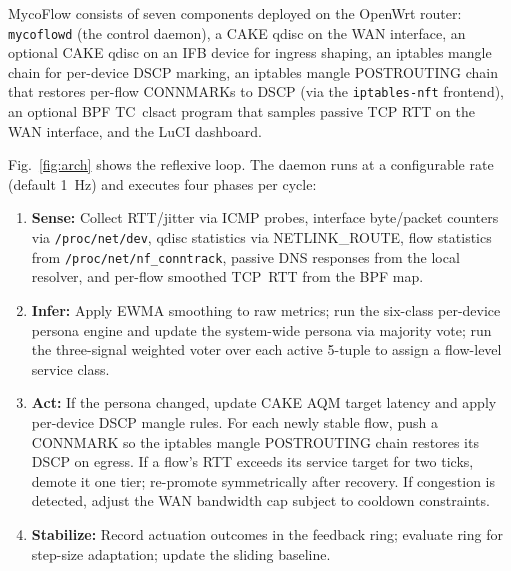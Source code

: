 \documentclass[conference]{IEEEtran}
\begin{document}
MycoFlow consists of seven components deployed on the OpenWrt router:
\texttt{mycoflowd} (the control daemon), a CAKE qdisc on the WAN interface,
an optional CAKE qdisc on an IFB device for ingress shaping, an iptables
mangle chain for per-device DSCP marking, an iptables mangle POSTROUTING
chain that restores per-flow CONNMARKs to DSCP (via the \texttt{iptables-nft}
frontend), an optional BPF TC~clsact
program that samples passive TCP RTT on the WAN interface, and the LuCI
dashboard.

Fig.~\ref{fig:arch} shows the reflexive loop.
The daemon runs at a configurable rate (default 1~Hz) and executes four
phases per cycle:

\begin{enumerate}
  \item \textbf{Sense:} Collect RTT/jitter via ICMP probes, interface
    byte/packet counters via \texttt{/proc/net/dev}, qdisc statistics
    via NETLINK\_ROUTE, flow statistics from
    \texttt{/proc/net/nf\_conntrack}, passive DNS responses from the
    local resolver, and per-flow smoothed TCP~RTT from the BPF map.
  \item \textbf{Infer:} Apply EWMA smoothing to raw metrics; run the
    six-class per-device persona engine and update the system-wide
    persona via majority vote; run the three-signal weighted voter
    over each active 5-tuple to assign a flow-level service class.
  \item \textbf{Act:} If the persona changed, update CAKE AQM target
    latency and apply per-device DSCP mangle rules. For each
    newly stable flow, push a CONNMARK so the iptables mangle
    POSTROUTING chain restores its DSCP on egress.
    If a flow's RTT exceeds its service target for two ticks,
    demote it one tier; re-promote symmetrically after recovery.
    If congestion is detected, adjust the WAN bandwidth cap
    subject to cooldown constraints.
  \item \textbf{Stabilize:} Record actuation outcomes in the feedback ring;
    evaluate ring for step-size adaptation; update the sliding baseline.
\end{enumerate}
\end{document}
